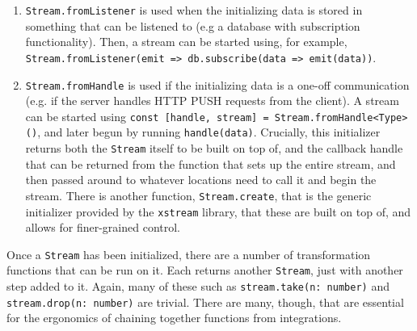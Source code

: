 \documentclass[manuscript,review,anonymous]{acmart}
\begin{document}
\begin{enumerate}
\tightlist
\item
  \texttt{Stream.fromListener} is used when the initializing data is
  stored in something that can be listened to (e.g a database with
  subscription functionality). Then, a stream can be started using, for
  example,
  \texttt{Stream.fromListener(emit\ =\textgreater{}\ db.subscribe(data\ =\textgreater{}\ emit(data))}.
\item
  \texttt{Stream.fromHandle} is used if the initializing data is a
  one-off communication (e.g. if the server handles HTTP PUSH requests
  from the client). A stream can be started using
  \texttt{const\ {[}handle,\ stream{]}\ =\ Stream.fromHandle\textless{}Type\textgreater{}()},
  and later begun by running \texttt{handle(data)}. Crucially, this
  initializer returns both the \texttt{Stream} itself to be built on top
  of, and the callback handle that can be returned from the function
  that sets up the entire stream, and then passed around to whatever
  locations need to call it and begin the stream. There is another
  function, \texttt{Stream.create}, that is the generic initializer
  provided by the \texttt{xstream} library, that these are built on top
  of, and allows for finer-grained control.
\end{enumerate}

Once a \texttt{Stream} has been initialized, there are a number of
transformation functions that can be run on it. Each returns another
\texttt{Stream}, just with another step added to it. Again, many of
these such as \texttt{stream.take(n:\ number)} and
\texttt{stream.drop(n:\ number)} are trivial. There are many, though,
that are essential for the ergonomics of chaining together functions
from integrations.
\end{document}
